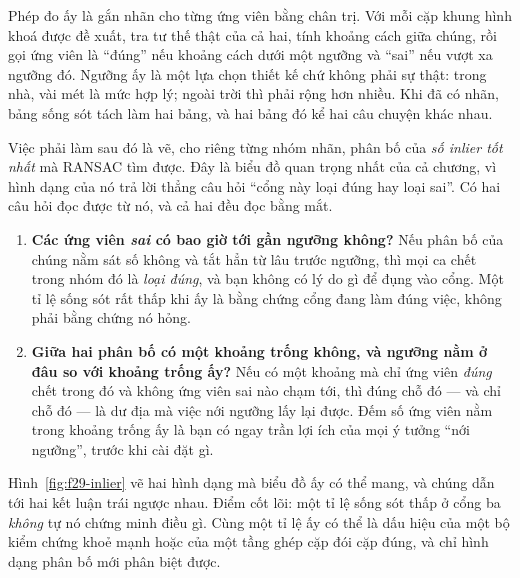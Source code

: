 \documentclass[../../deep_learning.tex]{subfiles}
\begin{document}
Phép đo ấy là gắn nhãn cho từng ứng viên bằng chân trị. Với mỗi cặp khung hình khoá được đề xuất, tra tư thế thật của cả hai, tính khoảng cách giữa chúng, rồi gọi ứng viên là ``đúng'' nếu khoảng cách dưới một ngưỡng và ``sai'' nếu vượt xa ngưỡng đó. Ngưỡng ấy là một lựa chọn thiết kế chứ không phải sự thật: trong nhà, vài mét là mức hợp lý; ngoài trời thì phải rộng hơn nhiều. Khi đã có nhãn, bảng sống sót tách làm hai bảng, và hai bảng đó kể hai câu chuyện khác nhau.

Việc phải làm sau đó là vẽ, cho riêng từng nhóm nhãn, phân bố của \emph{số inlier tốt nhất} mà RANSAC tìm được. Đây là biểu đồ quan trọng nhất của cả chương, vì hình dạng của nó trả lời thẳng câu hỏi ``cổng này loại đúng hay loại sai''. Có hai câu hỏi đọc được từ nó, và cả hai đều đọc bằng mắt.

\begin{enumerate}
\item \textbf{Các ứng viên \emph{sai} có bao giờ tới gần ngưỡng không?} Nếu phân bố của chúng nằm sát số không và tắt hẳn từ lâu trước ngưỡng, thì mọi ca chết trong nhóm đó là \emph{loại đúng}, và bạn không có lý do gì để đụng vào cổng. Một tỉ lệ sống sót rất thấp khi ấy là bằng chứng cổng đang làm đúng việc, không phải bằng chứng nó hỏng.
\item \textbf{Giữa hai phân bố có một khoảng trống không, và ngưỡng nằm ở đâu so với khoảng trống ấy?} Nếu có một khoảng mà chỉ ứng viên \emph{đúng} chết trong đó và không ứng viên sai nào chạm tới, thì đúng chỗ đó --- và chỉ chỗ đó --- là dư địa mà việc nới ngưỡng lấy lại được. Đếm số ứng viên nằm trong khoảng trống ấy là bạn có ngay trần lợi ích của mọi ý tưởng ``nới ngưỡng'', trước khi cài đặt gì.
\end{enumerate}

Hình~\ref{fig:f29-inlier} vẽ hai hình dạng mà biểu đồ ấy có thể mang, và chúng dẫn tới hai kết luận trái ngược nhau. Điểm cốt lõi: một tỉ lệ sống sót thấp ở cổng ba \emph{không} tự nó chứng minh điều gì. Cùng một tỉ lệ ấy có thể là dấu hiệu của một bộ kiểm chứng khoẻ mạnh hoặc của một tầng ghép cặp đói cặp đúng, và chỉ hình dạng phân bố mới phân biệt được.
\end{document}
